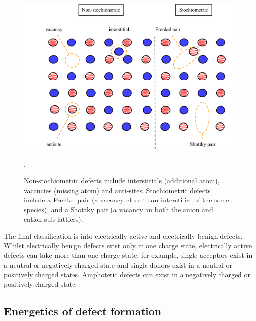 \begin{figure}[h]
\centering
  \includegraphics[width=1.0\columnwidth]{figures/ch3/classification.png}
  \caption[Classification of crystal point-defects]{Non-stochiometric defects include interstitials (additional atom), vacancies (missing atom) and anti-sites. Stochiometric defects include a Frenkel pair (a vacancy close to an interstitial of the same species), and a Shottky pair (a vacancy on both the anion and cation sub-lattices).}
  \label{classification} . %
\end{figure}

The final classification is into electrically active and electrically benign defects. Whilst electrically benign defects exist only in one charge state, electrically active defects can take more than one charge state; for example, single acceptors exist in a neutral or negatively charged state and single donors exist in a neutral or positively charged states. Amphoteric defects can exist in a negatively charged or positively charged state.

\subsection{Energetics of defect formation} \label{defectformation}

